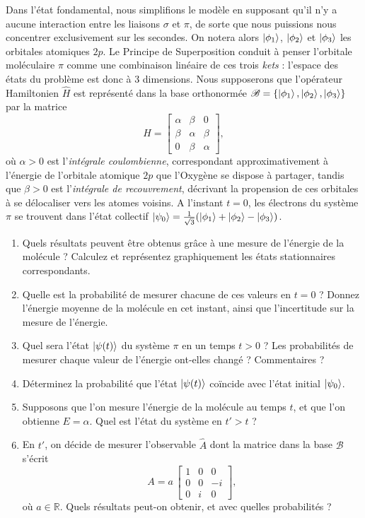 Dans l'état fondamental, nous simplifions le modèle en supposant qu'il n'y a aucune interaction entre les liaisons $\sigma$ et $\pi$, de sorte que nous puissions nous concentrer exclusivement sur les secondes. On notera alors $\ket{\phi_1}$, $\ket{\phi_2}$ et $\ket{\phi_3}$ les orbitales atomiques $2p$. Le Principe de Superposition conduit à penser l'orbitale moléculaire $\pi$ comme une combinaison linéaire de ces trois \textit{kets} : l'espace des états du problème est donc à 3 dimensions. Nous supposerons que l'opérateur Hamiltonien $\hat H$ est représenté dans la base orthonormée $\mathscr B = \lbrace \ket{\phi_1},\ket{\phi_2},\ket{\phi_3}\rbrace$ par la matrice
\begin{equation}
H = \left[
\begin{array}{ccc}
\alpha & \beta & 0 \\
\beta & \alpha & \beta \\
0 & \beta & \alpha
\end{array}
\right],
\end{equation}
où $\alpha>0$ est l'\textit{intégrale coulombienne}, correspondant approximativement à l'énergie de l'orbitale atomique $2p$ que l'Oxygène se dispose à partager, tandis que $\beta>0$ est l'\textit{intégrale de recouvrement}, décrivant la propension de ces orbitales à se délocaliser vers les atomes voisins. A l'instant $t=0$, les électrons du système $\pi$ se trouvent dans l'état collectif $\ket{\psi_0} = \frac{1}{\sqrt{3}}(\ket{\phi_1}+\ket{\phi_2}-\ket{\phi_3})$.
\begin{enumerate}
\item Quels résultats peuvent être obtenus grâce à une mesure de l'énergie de la molécule ? Calculez et représentez graphiquement les états stationnaires correspondants.
\item Quelle est la probabilité de mesurer chacune de ces valeurs en $t=0$ ? Donnez l'énergie moyenne de la molécule en cet instant, ainsi que l'incertitude sur la mesure de l'énergie.
\item Quel sera l'état $\ket{\psi(t)}$ du système $\pi$ en un temps $t>0$ ? Les probabilités de mesurer chaque valeur de l'énergie ont-elles changé ? Commentaires ?
\item Déterminez la probabilité que l'état $\ket{\psi(t)}$ coïncide avec l'état initial $\ket{\psi_0}$.
\item Supposons que l'on mesure l'énergie de la molécule au temps $t$, et que l'on obtienne $E=\alpha$. Quel est l'état du système en $t'>t$ ?
\item En $t'$, on décide de mesurer l'observable $\hat A$ dont la matrice dans la base $\mathscr B$ s'écrit
\begin{equation}
A = a\, \left[
\begin{array}{ccc}
1 & 0 & 0 \\
0 & 0 & -i \\
0 & i & 0
\end{array}
\right],
\end{equation}
où $a\in\mathbb R$. Quels résultats peut-on obtenir, et avec quelles probabilités ? 
\end{enumerate}





